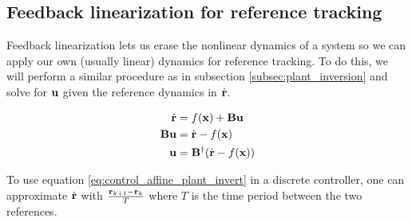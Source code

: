 \subsection{Feedback linearization for reference tracking}

Feedback linearization lets us erase the nonlinear dynamics of a system so we
can apply our own (usually linear) dynamics for \gls{reference} tracking. To do
this, we will perform a similar procedure as in subsection
\ref{subsec:plant_inversion} and solve for $\mathbf{u}$ given the \gls{reference}
dynamics in $\dot{\mathbf{r}}$.

\begin{align}
  \dot{\mathbf{r}} &= f(\mathbf{x}) + \mathbf{B}\mathbf{u} \nonumber \\
  \mathbf{B}\mathbf{u} &= \dot{\mathbf{r}} - f(\mathbf{x}) \nonumber \\
  \mathbf{u} &= \mathbf{B}^\dagger (\dot{\mathbf{r}} - f(\mathbf{x}))
    \label{eq:control_affine_plant_invert}
\end{align}

\begin{remark}
  To use equation \eqref{eq:control_affine_plant_invert} in a discrete
  controller, one can approximate $\dot{\mathbf{r}}$ with
  $\frac{\mathbf{r}_{k + 1} - \mathbf{r}_k}{T}$ where $T$ is the time period between
  the two \glspl{reference}.
\end{remark}

